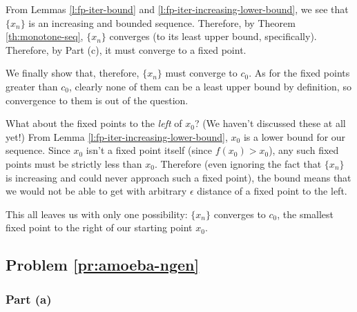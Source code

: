 From Lemmas \ref{l:fp-iter-bound} and \ref{l:fp-iter-increasing-lower-bound}, we see that $\{x_n\}$ is an increasing and bounded sequence. Therefore, by Theorem \ref{th:monotone-seq}, $\{x_n\}$ converges (to its least upper bound, specifically). Therefore, by Part (c), it must converge to a fixed point.

We finally show that, therefore, $\{x_n\}$ must converge to $c_0$. As for the fixed points greater than $c_0$, clearly none of them can be a least upper bound by definition, so convergence to them is out of the question.

What about the fixed points to the \emph{left} of $x_0$? (We haven't discussed these at all yet!) From Lemma \ref{l:fp-iter-increasing-lower-bound}, $x_0$ is a lower bound for our sequence. Since $x_0$ isn't a fixed point itself (since $f(x_0) > x_0$), any such fixed points must be strictly less than $x_0$. Therefore (even ignoring the fact that $\{x_n\}$ is increasing and could never approach such a fixed point), the bound means that we would not be able to get with arbitrary $\epsilon$ distance of a fixed point to the left.

This all leaves us with only one possibility: $\{x_n\}$ converges to $c_0$, the smallest fixed point to the right of our starting point $x_0$.



 



\subsection{Problem \ref{pr:amoeba-ngen}}

\subsubsection{Part (a)}

